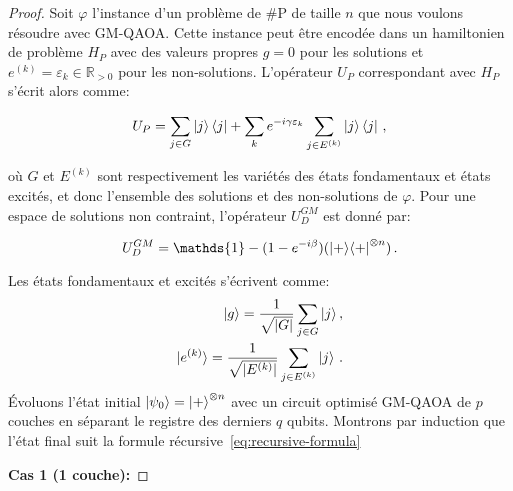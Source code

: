 \begin{proof}
    
Soit $\varphi$ l'instance d'un problème de \textsf{\#P} de taille $n$ que nous voulons résoudre avec GM-QAOA. Cette instance peut être encodée dans un hamiltonien de problème $H_{P}$ avec des valeurs propres $g = 0$ pour les solutions et $e^{(k)} = \varepsilon_{k} \in \mathbb{R}_{>0}$ pour les non-solutions. L'opérateur $U_{P}$ correspondant avec $H_{P}$ s'écrit alors comme:

\begin{equation}
    U_{P} = \sum_{j \in G} \ket{j}\bra{j} + \sum_{k} e^{-i \gamma \varepsilon_{k}} \sum_{j \in E^{(k)}} \ket{j}\bra{j} \,,
\end{equation} 

où $G$ et $E^{(k)}$ sont respectivement les variétés des états fondamentaux et états excités, et donc l'ensemble des solutions et des non-solutions de $\varphi$. Pour une espace de solutions non contraint, l'opérateur $U_{D}^{GM}$ est donné par:

\begin{equation}
    U_{D}^{GM} = \mathds{1} - (1 - e^{-i\beta}) (\ket{+}\!\bra{+}^{\otimes n}) \,.
\end{equation}

Les états fondamentaux et excités s'écrivent comme:
\begin{align}
    \ket{g} = \frac{1}{\sqrt{ \lvert G \rvert }} \sum_{j \in G} \ket{j}, \\
    \ket{e^{(k)}} = \frac{1}{\sqrt{ \lvert E^{(k)} \rvert }} \sum_{j \in E^{(k)}} \ket{j} \,.
\end{align}
Évoluons l'état initial $\ket{\psi_{0}} = \ket{+}^{\otimes n}$ avec un circuit optimisé GM-QAOA de $p$ couches en séparant le registre des derniers $q$ qubits. Montrons par induction que l'état final suit la formule récursive~\ref{eq:recursive-formula}

\textbf{Cas 1 (1 couche):}


\end{proof}
